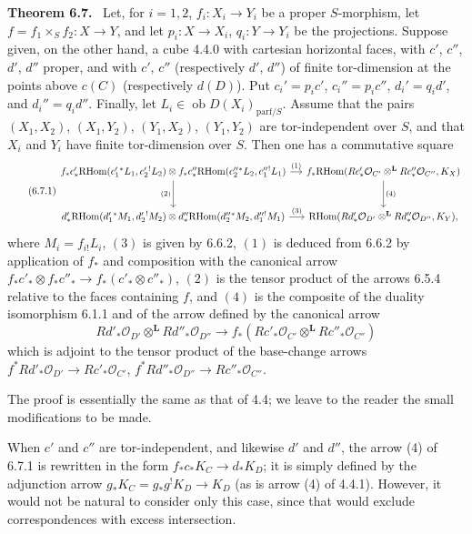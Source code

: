 \documentclass[11pt]{article}
\providecommand{\cO}{\mathcal{O}}
\newenvironment{statement}[1]{\par\medskip\noindent\textbf{#1.}\ }{\par\medskip}
\providecommand{\RHom}{\mathrm{RHom}}
\providecommand{\RHom}{\mathrm{RHom}}
\providecommand{\RHom}{\mathrm R\mathcal{H}om}
\begin{document}
\begin{statement}{Theorem 6.7}
Let, for $i=1,2$, $f_i:X_i\to Y_i$ be a proper $S$-morphism, let $f=f_1\times_Sf_2:X\to Y$, and let $p_i:X\to X_i$, $q_i:Y\to Y_i$ be the projections. Suppose given, on the other hand, a cube 4.4.0 with cartesian horizontal faces, with $c'$, $c''$, $d'$, $d''$ proper, and with $c'$, $c''$ (respectively $d'$, $d''$) of finite tor-dimension at the points above $c(C)$ (respectively $d(D)$). Put $c_i'=p_ic'$, $c_i''=p_ic''$, $d_i'=q_id'$, and $d_i''=q_id''$. Finally, let $L_i\in\operatorname{ob}D(X_i)_{\mathrm{parf}/S}$. Assume that the pairs $(X_1,X_2)$, $(X_1,Y_2)$, $(Y_1,X_2)$, $(Y_1,Y_2)$ are tor-independent over $S$, and that $X_i$ and $Y_i$ have finite tor-dimension over $S$. Then one has a commutative square
\begin{equation}
\tag{6.7.1}
\begin{tikzcd}[column sep=small,row sep=large]
f_*c'_*\RHom(c_1'{}^*L_1,c_2'{}^!L_2)\otimes f_*c''_*\RHom(c_2''{}^*L_2,c_1''{}^!L_1) \arrow[r,"(1)"] \arrow[d,"(2)"']
& f_*\RHom(Rc'_*\cO_{C'}\otimes^{\mathbf L}Rc''_*\cO_{C''},K_X) \arrow[d,"(4)"] \\
d'_*\RHom(d_1'{}^*M_1,d_2'{}^!M_2)\otimes d''_*\RHom(d_2''{}^*M_2,d_1''{}^!M_1) \arrow[r,"(3)"]
& \RHom(Rd'_*\cO_{D'}\otimes^{\mathbf L}Rd''_*\cO_{D''},K_Y),
\end{tikzcd}
\end{equation}
where $M_i=f_{i!}L_i$, $(3)$ is given by 6.6.2, $(1)$ is deduced from 6.6.2 by application of $f_*$ and composition with the canonical arrow $f_*c'_*\otimes f_*c''_*\to f_*(c'_*\otimes c''_*)$, $(2)$ is the tensor product of the arrows 6.5.4 relative to the faces containing $f$, and $(4)$ is the composite of the duality isomorphism 6.1.1 and of the arrow defined by the canonical arrow
\[
Rd'_*\cO_{D'}\otimes^{\mathbf L}Rd''_*\cO_{D''}\longrightarrow f_*(Rc'_*\cO_{C'}\otimes^{\mathbf L}Rc''_*\cO_{C''})
\]
which is adjoint to the tensor product of the base-change arrows $f^*Rd'_*\cO_{D'}\to Rc'_*\cO_{C'}$, $f^*Rd''_*\cO_{D''}\to Rc''_*\cO_{C''}$.
\end{statement}

The proof is essentially the same as that of 4.4; we leave to the reader the small modifications to be made.

When $c'$ and $c''$ are tor-independent, and likewise $d'$ and $d''$, the arrow (4) of 6.7.1 is rewritten in the form $f_*c_*K_C\to d_*K_D$; it is simply defined by the adjunction arrow $g_*K_C=g_*g^!K_D\to K_D$ (as is arrow (4) of 4.4.1). However, it would not be natural to consider only this case, since that would exclude correspondences with excess intersection.
\end{document}
